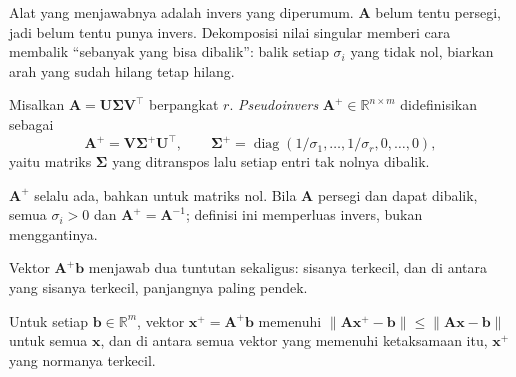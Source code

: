 Alat yang menjawabnya adalah invers yang diperumum. $\mathbf{A}$ belum tentu persegi, jadi
belum tentu punya invers. Dekomposisi nilai singular memberi cara membalik ``sebanyak yang
bisa dibalik'': balik setiap $\sigma_{i}$ yang tidak nol, biarkan arah yang sudah hilang
tetap hilang.


\begin{definisi}[Pseudoinvers]
Misalkan $\mathbf{A}=\mathbf{U}\boldsymbol{\Sigma}\mathbf{V}^{\top}$ berpangkat $r$.
\emph{Pseudoinvers} $\mathbf{A}^{+}\in\mathbb{R}^{n\times m}$ didefinisikan sebagai
\[
  \mathbf{A}^{+}=\mathbf{V}\boldsymbol{\Sigma}^{+}\mathbf{U}^{\top},
  \qquad
  \boldsymbol{\Sigma}^{+}=\operatorname{diag}(1/\sigma_{1},\dots,1/\sigma_{r},0,\dots,0),
\]
yaitu matriks $\boldsymbol{\Sigma}$ yang ditranspos lalu setiap entri tak nolnya
dibalik.
\end{definisi}

$\mathbf{A}^{+}$ selalu ada, bahkan untuk matriks nol. Bila $\mathbf{A}$ persegi dan
dapat dibalik, semua $\sigma_{i}>0$ dan $\mathbf{A}^{+}=\mathbf{A}^{-1}$; definisi ini
memperluas invers, bukan menggantinya.

Vektor $\mathbf{A}^{+}\mathbf{b}$ menjawab dua tuntutan sekaligus: sisanya terkecil, dan
di antara yang sisanya terkecil, panjangnya paling pendek.

\begin{teorema}
Untuk setiap $\mathbf{b}\in\mathbb{R}^{m}$, vektor
$\mathbf{x}^{+}=\mathbf{A}^{+}\mathbf{b}$ memenuhi
$\|\mathbf{A}\mathbf{x}^{+}-\mathbf{b}\|\le\|\mathbf{A}\mathbf{x}-\mathbf{b}\|$ untuk
semua $\mathbf{x}$, dan di antara semua vektor yang memenuhi ketaksamaan itu,
$\mathbf{x}^{+}$ yang normanya terkecil.
\end{teorema}

